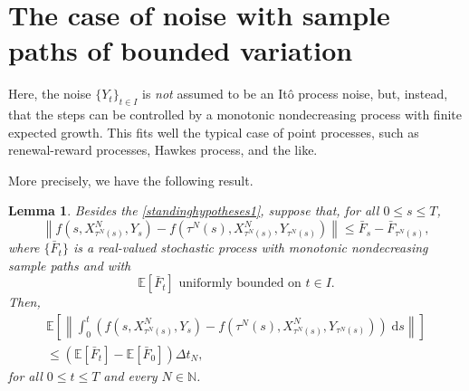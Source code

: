 \documentclass[reqno,12pt]{amsart}
\theoremstyle{plain} %
\newtheorem{lemma}{Lemma}[section]
\theoremstyle{definition} %
\begin{document}
\section{The case of noise with sample paths of bounded variation}
\label{secmonotonicbound}

Here, the noise $\{Y_t\}_{t\in I}$ is \emph{not} assumed to be an It\^o process noise, but, instead, that the steps can be controlled by a monotonic nondecreasing process with finite expected growth. This fits well the typical case of point processes, such as renewal-reward processes, Hawkes process, and the like.

More precisely, we have the following result.
\begin{lemma}
    \label{lemmonotonicbound}
    Besides the \cref{standinghypotheses1}, suppose that, for all $0 \leq s \leq T$,
    \begin{equation}
        \label{stepbound}
          \left\|f(s, X_{\tau^N(s)}^N, Y_s) - f({\tau^N(s)}, X_{\tau^N(s)}^N, Y_{\tau^N(s)})\right\| \leq \bar F_s - \bar F_{\tau^N(s)},
      \end{equation}
      where $\{\bar F_t\}$ is a real-valued stochastic process with monotonic nondecreasing sample paths and with
      \begin{equation}
        \label{expectstepmonotonic}
        \mathbb{E}[\bar F_t] \textrm{ uniformly bounded on } t\in I.
      \end{equation}
      Then,
      \begin{multline}
        \label{expectintfboundbyG}
          \mathbb{E}\left[\left\|\int_0^t \left( f(s, X_{\tau^N(s)}^N, Y_s) - f(\tau^N(s), X_{\tau^N(s)}^N, Y_{\tau^N(s)}) \right)\;\mathrm{d}s\right\|\right] \\
          \leq (\mathbb{E}[\bar F_t] - \mathbb{E}[\bar F_0])\Delta t_N,
      \end{multline}
      for all $0 \leq t \leq T$ and every $N\in \mathbb{N}$.
\end{lemma}
\end{document}
